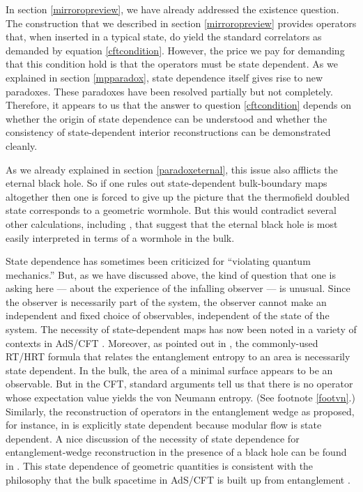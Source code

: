 \documentclass[12pt]{article}
\begin{document}
In section \ref{mirroropreview}, we have already addressed the existence question. The construction that we described in section \ref{mirroropreview} provides operators that, when inserted in a typical state, do yield the standard correlators as demanded by equation \eqref{cftcondition}. However, the price we pay for demanding that this condition hold is that the operators must be state dependent. As we explained in section \ref{mpparadox}, state dependence itself gives rise to new paradoxes. These paradoxes have been resolved partially but not completely. Therefore, it appears to us that the answer to question \eqref{cftcondition} depends on whether the origin of state dependence can be understood and whether the consistency of state-dependent interior reconstructions can be demonstrated cleanly.
 

As we already explained in section \ref{paradoxeternal}, this issue also afflicts the eternal black hole. 
So if one rules out state-dependent bulk-boundary maps altogether then one is forced to give up the picture that the thermofield doubled state corresponds to a geometric wormhole. But this would contradict several other calculations, including \cite{Gao:2016bin}, that suggest that the eternal black hole is most easily interpreted in terms of a wormhole in the bulk.



State dependence has sometimes been criticized for ``violating quantum mechanics.'' But, as we have discussed above, the kind of question that one is asking here --- about the experience of the infalling observer --- is unusual. Since the observer is necessarily part of the system, the observer cannot make an independent and fixed choice of observables, independent of the state of the system. The necessity of state-dependent maps has now been noted in a variety of  contexts in AdS/CFT  \cite{Berenstein:2016pcx,Berenstein:2017abm,Jafferis:2014lza,Guica:2015zpf,Jafferis:2017tiu,Jefferson:2018ksk,Bzowski:2018aiq,vanBreukelen:2019zxq}.  
Moreover, as pointed out in \cite{Papadodimas:2015jra}, the commonly-used RT/HRT formula that relates the entanglement entropy to an area is necessarily state dependent.  In the bulk, the area of a minimal surface appears to be an observable. But in the CFT, standard arguments tell us that there is no operator whose expectation value yields the von Neumann entropy. (See footnote \ref{footvn}.) Similarly, the reconstruction of operators in the entanglement wedge as proposed, for instance, in \cite{Faulkner:2017vdd} is explicitly state dependent because modular flow is state dependent.  A nice discussion of the necessity of state dependence for entanglement-wedge reconstruction in the presence of a black hole can be found in \cite{Hayden:2018khn}. This state dependence of geometric quantities is consistent with the philosophy that the bulk spacetime in AdS/CFT is built up from entanglement \cite{VanRaamsdonk:2010pw,VanRaamsdonk:2011zz}.
\end{document}
